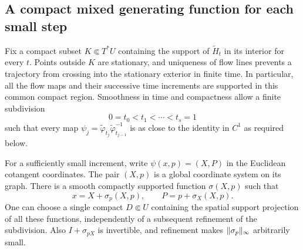 \subsection{A compact mixed generating function for each small step}

Fix a compact subset $K\Subset T^*U$ containing the support of
$\widetilde H_t$ in its interior for every $t$.  Points outside $K$
are stationary, and uniqueness of flow lines prevents a trajectory
from crossing into the stationary exterior in finite time.  In
particular, all the flow maps and their successive time increments
are supported in this common compact region.  Smoothness in time and
compactness allow a finite subdivision
\[
 0=t_0<t_1<\cdots<t_s=1
\]
such that every map
$\psi_j=\widetilde\varphi_{t_j}\widetilde\varphi_{t_{j-1}}^{-1}$
is as close to the identity in $C^1$ as required below.

\begin{lemma}
\label{lem:transport-mixed-generator}
For a sufficiently small increment, write
$\psi(x,p)=(X,P)$ in the Euclidean cotangent coordinates.  The pair
$(X,p)$ is a global coordinate system on its graph.  There is a smooth
compactly supported function $\sigma(X,p)$ such that
\begin{equation}
 x=X+\sigma_p(X,p),\qquad P=p+\sigma_X(X,p).
 \label{eq:transport-mixed-graph}
\end{equation}
One can choose a single compact $D\Subset U$ containing the spatial
support projection of all these functions, independently of a
subsequent refinement of the subdivision.  Also
$I+\sigma_{pX}$ is invertible, and refinement makes
$\lVert\sigma_p\rVert_\infty$ arbitrarily small.
\end{lemma}

